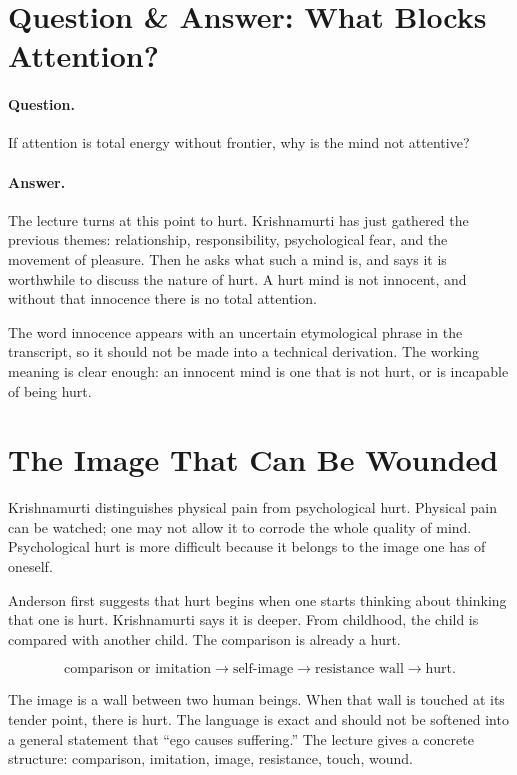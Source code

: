 \documentclass[11pt,oneside]{book}
\begin{document}
\section{Question \& Answer: What Blocks Attention?}

\paragraph{Question.}
If attention is total energy without frontier, why is the mind not attentive?

\paragraph{Answer.}
The lecture turns at this point to hurt. Krishnamurti has just gathered the previous themes: relationship, responsibility, psychological fear, and the movement of pleasure. Then he asks what such a mind is, and says it is worthwhile to discuss the nature of hurt. A hurt mind is not innocent, and without that innocence there is no total attention.

The word innocence appears with an uncertain etymological phrase in the transcript, so it should not be made into a technical derivation. The working meaning is clear enough: an innocent mind is one that is not hurt, or is incapable of being hurt.

\section{The Image That Can Be Wounded}

Krishnamurti distinguishes physical pain from psychological hurt. Physical pain can be watched; one may not allow it to corrode the whole quality of mind. Psychological hurt is more difficult because it belongs to the image one has of oneself.

Anderson first suggests that hurt begins when one starts thinking about thinking that one is hurt. Krishnamurti says it is deeper. From childhood, the child is compared with another child. The comparison is already a hurt.

\begin{equation}
\text{comparison or imitation}
\longrightarrow
\text{self-image}
\longrightarrow
\text{resistance wall}
\longrightarrow
\text{hurt}.
\end{equation}

The image is a wall between two human beings. When that wall is touched at its tender point, there is hurt. The language is exact and should not be softened into a general statement that ``ego causes suffering.'' The lecture gives a concrete structure: comparison, imitation, image, resistance, touch, wound.
\end{document}
